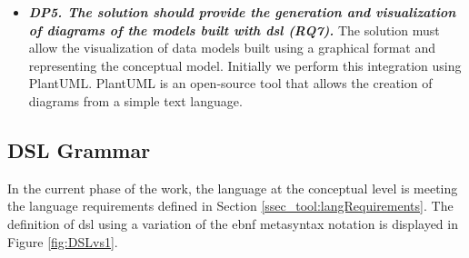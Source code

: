 \begin{itemize}
    \item\textit{\textbf{DP5. The solution should provide the generation and visualization of diagrams of the models built with \ac{dsl} (RQ7).}}
    The solution must allow the visualization of data models built using a graphical format and representing the conceptual model.
    Initially we perform this integration using PlantUML.
    PlantUML is an open-source tool that allows the creation of diagrams from a simple text language.
\end{itemize}


\subsection{DSL Grammar} \label{ssec_tool:grammar}

In the current phase of the work, the language at the conceptual level is meeting the language requirements defined in Section \ref{ssec_tool:langRequirements}.
The definition of \ac{dsl} using a variation of the \ac{ebnf} metasyntax notation is displayed in Figure \autoref{fig:DSLvs1}.


